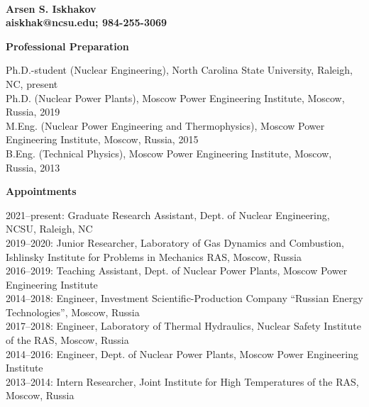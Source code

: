 \documentclass[11pt,letterpaper,english]{article}
\begin{document}
\setlength{\parindent}{0in} %

\pagestyle{fancy}   \renewcommand{%
\headrulewidth}{0.0pt}



\\
{\bf Arsen S. Iskhakov}\\
{\bf aiskhak@ncsu.edu; 984-255-3069} \smallskip

\begin{flushleft} {\bf Professional Preparation}
{\parindent 16pt

Ph.D.-student (Nuclear Engineering), North Carolina State University, Raleigh, NC, present \\
Ph.D. (Nuclear Power Plants), Moscow Power Engineering Institute, Moscow, Russia, 2019\\ 
M.Eng. (Nuclear Power Engineering and Thermophysics), Moscow Power Engineering Institute, Moscow, Russia, 2015\\ 
B.Eng. (Technical Physics), Moscow Power Engineering Institute, Moscow, Russia, 2013 \\ 
}

\vspace{.04in}
{\bf Appointments}
{\parindent 16pt

2021--present: Graduate Research Assistant, Dept. of Nuclear Engineering, NCSU, Raleigh, NC \\
2019--2020: Junior Researcher, Laboratory of Gas Dynamics and Combustion, Ishlinsky Institute for Problems in Mechanics RAS, Moscow, Russia \\
2016--2019: Teaching Assistant, Dept. of Nuclear Power Plants, Moscow Power Engineering Institute \\
2014--2018: Engineer, Investment Scientific-Production Company “Russian Energy Technologies”, Moscow, Russia \\
2017--2018: Engineer, Laboratory of Thermal Hydraulics, Nuclear Safety Institute of the RAS, Moscow, Russia \\
2014--2016: Engineer, Dept. of Nuclear Power Plants, Moscow Power Engineering Institute \\
2013--2014: Intern Researcher, Joint Institute for High Temperatures of the RAS, Moscow, Russia \\
}


\end{flushleft}
\end{document}
